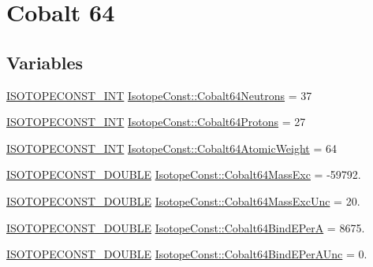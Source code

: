 \hypertarget{group___isotope_const-_cobalt-_co64}{}\section{Cobalt 64}
\label{group___isotope_const-_cobalt-_co64}
\subsection*{Variables}
\begin{DoxyCompactItemize}
\item 
\mbox{\hyperlink{group___isotope_const-_macros_ga5f18360b3e99483a35c32d789e62621c}{I\+S\+O\+T\+O\+P\+E\+C\+O\+N\+S\+T\+\_\+\+I\+NT}} \mbox{\hyperlink{group___isotope_const-_cobalt-_co64_ga03e83986b226ff956c638df864026259}{Isotope\+Const\+::\+Cobalt64\+Neutrons}} = 37
\item 
\mbox{\hyperlink{group___isotope_const-_macros_ga5f18360b3e99483a35c32d789e62621c}{I\+S\+O\+T\+O\+P\+E\+C\+O\+N\+S\+T\+\_\+\+I\+NT}} \mbox{\hyperlink{group___isotope_const-_cobalt-_co64_ga6662f1f77df5f78d0708cb3d61701ce0}{Isotope\+Const\+::\+Cobalt64\+Protons}} = 27
\item 
\mbox{\hyperlink{group___isotope_const-_macros_ga5f18360b3e99483a35c32d789e62621c}{I\+S\+O\+T\+O\+P\+E\+C\+O\+N\+S\+T\+\_\+\+I\+NT}} \mbox{\hyperlink{group___isotope_const-_cobalt-_co64_ga06a5a5f17d0238cecf81433a6c55a2a4}{Isotope\+Const\+::\+Cobalt64\+Atomic\+Weight}} = 64
\item 
\mbox{\hyperlink{group___isotope_const-_macros_ga8f45a7272ce02c0b4c65c44636ed719a}{I\+S\+O\+T\+O\+P\+E\+C\+O\+N\+S\+T\+\_\+\+D\+O\+U\+B\+LE}} \mbox{\hyperlink{group___isotope_const-_cobalt-_co64_ga2bdd4c9f1ecab295ecf31225dacfad01}{Isotope\+Const\+::\+Cobalt64\+Mass\+Exc}} = -\/59792.
\item 
\mbox{\hyperlink{group___isotope_const-_macros_ga8f45a7272ce02c0b4c65c44636ed719a}{I\+S\+O\+T\+O\+P\+E\+C\+O\+N\+S\+T\+\_\+\+D\+O\+U\+B\+LE}} \mbox{\hyperlink{group___isotope_const-_cobalt-_co64_ga50690184e6bdd87dd258da8058753797}{Isotope\+Const\+::\+Cobalt64\+Mass\+Exc\+Unc}} = 20.
\item 
\mbox{\hyperlink{group___isotope_const-_macros_ga8f45a7272ce02c0b4c65c44636ed719a}{I\+S\+O\+T\+O\+P\+E\+C\+O\+N\+S\+T\+\_\+\+D\+O\+U\+B\+LE}} \mbox{\hyperlink{group___isotope_const-_cobalt-_co64_ga875a59a5f59ca3915f4b0cf4f674783b}{Isotope\+Const\+::\+Cobalt64\+Bind\+E\+PerA}} = 8675.
\item 
\mbox{\hyperlink{group___isotope_const-_macros_ga8f45a7272ce02c0b4c65c44636ed719a}{I\+S\+O\+T\+O\+P\+E\+C\+O\+N\+S\+T\+\_\+\+D\+O\+U\+B\+LE}} \mbox{\hyperlink{group___isotope_const-_cobalt-_co64_ga56d90af75ef423ef58a314025249a249}{Isotope\+Const\+::\+Cobalt64\+Bind\+E\+Per\+A\+Unc}} = 0.

\end{DoxyCompactItemize}
